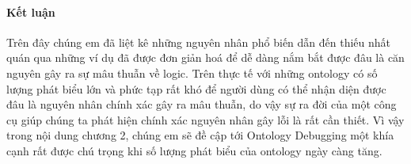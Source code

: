 \paragraph{Kết luận}
Trên đây chúng em đã liệt kê những nguyên nhân phổ biến dẫn đến thiếu nhất quán qua những ví dụ đã được đơn giản hoá để dễ dàng nắm bắt được đâu là căn nguyên gây ra sự mâu thuẫn về logic. Trên thực tế với những ontology có số lượng phát biểu lớn và phức tạp rất khó để người dùng có thể nhận diện được đâu là nguyên nhân chính xác gây ra mâu thuẫn, do vậy sự ra đời của một công cụ giúp chúng ta phát hiện chính xác nguyên nhân gây lỗi là rất cần thiết. Vì vậy trong nội dung chương 2, chúng em sẽ đề cập tới Ontology Debugging một khía cạnh rất được chú trọng khi số lượng phát biểu của ontology ngày càng tăng.























